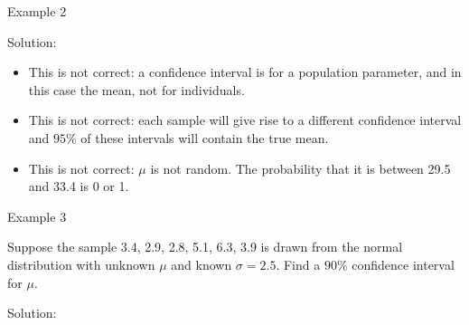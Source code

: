 \documentclass[
  ignorenonframetext,
]{beamer}
\begin{document}
\begin{frame}{Example 2}
\protect\hypertarget{example-2-1}{}
\begin{tcolorbox}
Solution: 
\begin{itemize}
\item This is not correct: a confidence interval is for a population parameter, and in this case the mean, not for individuals.

\item This is not correct: each sample will give rise to a different confidence interval and $95\%$ of these intervals will contain the true mean.

\item This is not correct: $\mu$ is not random. The probability that it is between 29.5 and 33.4 is 0 or 1.
\end{itemize}
\end{tcolorbox}
\end{frame}

\begin{frame}{Example 3}
\protect\hypertarget{example-3}{}
\begin{tcolorbox}
 Suppose the sample 3.4, 2.9, 2.8, 5.1, 6.3, 3.9 is drawn from the normal distribution with unknown $\mu$ and known $\sigma=2.5$. Find a $90\%$ confidence interval for $\mu$.
\end{tcolorbox}

\begin{tcolorbox}
Solution: 

\vspace{30mm}


\end{tcolorbox}
\end{frame}
\end{document}
